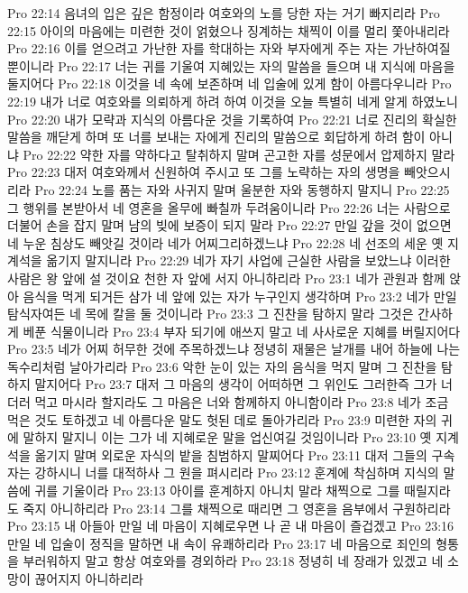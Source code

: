 Pro 22:14  음녀의 입은 깊은 함정이라 여호와의 노를 당한 자는 거기 빠지리라
Pro 22:15  아이의 마음에는 미련한 것이 얽혔으나 징계하는 채찍이 이를 멀리 쫓아내리라
Pro 22:16  이를 얻으려고 가난한 자를 학대하는 자와 부자에게 주는 자는 가난하여질 뿐이니라
Pro 22:17  너는 귀를 기울여 지혜있는 자의 말씀을 들으며 내 지식에 마음을 둘지어다
Pro 22:18  이것을 네 속에 보존하며 네 입술에 있게 함이 아름다우니라
Pro 22:19  내가 너로 여호와를 의뢰하게 하려 하여 이것을 오늘 특별히 네게 알게 하였노니
Pro 22:20  내가 모략과 지식의 아름다운 것을 기록하여
Pro 22:21  너로 진리의 확실한 말씀을 깨닫게 하며 또 너를 보내는 자에게 진리의 말씀으로 회답하게 하려 함이 아니냐
Pro 22:22  약한 자를 약하다고 탈취하지 말며 곤고한 자를 성문에서 압제하지 말라
Pro 22:23  대저 여호와께서 신원하여 주시고 또 그를 노략하는 자의 생명을 빼앗으시리라
Pro 22:24  노를 품는 자와 사귀지 말며 울분한 자와 동행하지 말지니
Pro 22:25  그 행위를 본받아서 네 영혼을 올무에 빠칠까 두려움이니라
Pro 22:26  너는 사람으로 더불어 손을 잡지 말며 남의 빚에 보증이 되지 말라
Pro 22:27  만일 갚을 것이 없으면 네 누운 침상도 빼앗길 것이라 네가 어찌그리하겠느냐
Pro 22:28  네 선조의 세운 옛 지계석을 옮기지 말지니라
Pro 22:29  네가 자기 사업에 근실한 사람을 보았느냐 이러한 사람은 왕 앞에 설 것이요 천한 자 앞에 서지 아니하리라
Pro 23:1  네가 관원과 함께 앉아 음식을 먹게 되거든 삼가 네 앞에 있는 자가 누구인지 생각하며
Pro 23:2  네가 만일 탐식자여든 네 목에 칼을 둘 것이니라
Pro 23:3  그 진찬을 탐하지 말라 그것은 간사하게 베푼 식물이니라
Pro 23:4  부자 되기에 애쓰지 말고 네 사사로운 지혜를 버릴지어다
Pro 23:5  네가 어찌 허무한 것에 주목하겠느냐 정녕히 재물은 날개를 내어 하늘에 나는 독수리처럼 날아가리라
Pro 23:6  악한 눈이 있는 자의 음식을 먹지 말며 그 진찬을 탐하지 말지어다
Pro 23:7  대저 그 마음의 생각이 어떠하면 그 위인도 그러한즉 그가 너더러 먹고 마시라 할지라도 그 마음은 너와 함께하지 아니함이라
Pro 23:8  네가 조금 먹은 것도 토하겠고 네 아름다운 말도 헛된 데로 돌아가리라
Pro 23:9  미련한 자의 귀에 말하지 말지니 이는 그가 네 지혜로운 말을 업신여길 것임이니라
Pro 23:10  옛 지계석을 옮기지 말며 외로운 자식의 밭을 침범하지 말찌어다
Pro 23:11  대저 그들의 구속자는 강하시니 너를 대적하사 그 원을 펴시리라
Pro 23:12  훈계에 착심하며 지식의 말씀에 귀를 기울이라
Pro 23:13  아이를 훈계하지 아니치 말라 채찍으로 그를 때릴지라도 죽지 아니하리라
Pro 23:14  그를 채찍으로 때리면 그 영혼을 음부에서 구원하리라
Pro 23:15  내 아들아 만일 네 마음이 지혜로우면 나 곧 내 마음이 즐겁겠고
Pro 23:16  만일 네 입술이 정직을 말하면 내 속이 유쾌하리라
Pro 23:17  네 마음으로 죄인의 형통을 부러워하지 말고 항상 여호와를 경외하라
Pro 23:18  정녕히 네 장래가 있겠고 네 소망이 끊어지지 아니하리라
